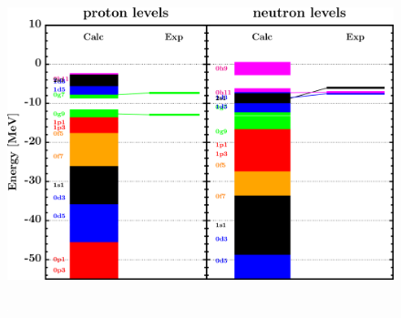 \documentclass[twocolumn,secnumarabic,amssymb, nobibnotes, aps, prl,
superscriptaddress, nobalancelastpage, draft]{revtex4}
\begin{document}
\begin{figure}[!htb]
\begin{minipage}{0.4\linewidth}
        \label{DOM_sn124_chargeDensity}
    \end{minipage}
    \begin{minipage}{0.35\linewidth}
        \centering
        \includegraphics[width=\linewidth]{figures/sn124_SPLevels.png}
        \label{DOM_sn124_SPLevels}
    \end{minipage}
    \begin{minipage}{0.4\linewidth}
        \centering
        \includegraphics[width=\linewidth]{figures/sn124_RMSRadius.png}

\end{minipage}
\end{figure}
\end{document}
